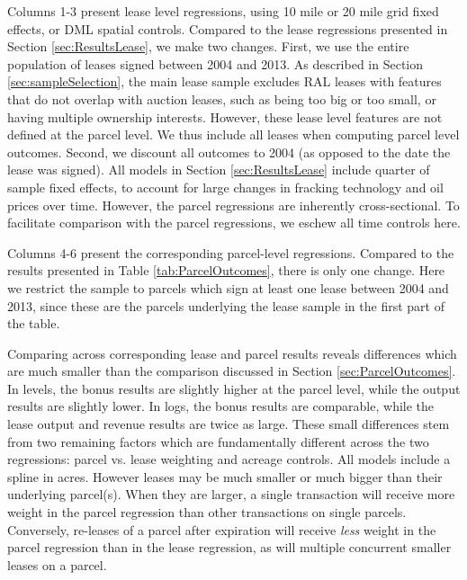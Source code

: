 \begin{appendices}
Columns 1-3 present lease level regressions, using 10 mile or 20 mile grid fixed effects, or DML spatial controls. Compared to the lease regressions presented in Section \ref{sec:ResultsLease}, we make two changes. First, we use the entire population of leases signed between 2004 and 2013. As described in Section \ref{sec:sampleSelection}, the main lease sample excludes RAL leases with features that do not overlap with auction leases, such as being too big or too small, or having multiple ownership interests. However, these lease level features are not defined at the parcel level. We thus include all leases when computing parcel level outcomes. Second, we discount all outcomes to 2004 (as opposed to the date the lease was signed). All models in Section \ref{sec:ResultsLease} include quarter of sample fixed effects, to account for large changes in fracking technology and oil prices over time. However, the parcel regressions are inherently cross-sectional. To facilitate comparison with the parcel regressions, we eschew all time controls here. 

Columns 4-6 present the corresponding parcel-level regressions. Compared to the results presented in Table \ref{tab:ParcelOutcomes}, there is only one change. Here we restrict the sample to parcels which sign at least one lease between 2004 and 2013, since these are the parcels underlying the lease sample in the first part of the table. 

Comparing across corresponding lease and parcel results reveals differences which are much smaller than the comparison discussed in Section \ref{sec:ParcelOutcomes}. In levels, the bonus results are slightly higher at the parcel level, while the output results are slightly lower. In logs, the bonus results are comparable, while the lease output and revenue results are twice as large. These small differences stem from two remaining factors which are fundamentally different across the two regressions: parcel vs. lease weighting and acreage controls. All models include a spline in acres. However leases may be much smaller or much bigger than their underlying parcel(s). When they are larger, a single transaction will receive more weight in the parcel regression than other transactions on single parcels. Conversely, re-leases of a parcel after expiration will receive \textit{less} weight in the parcel regression than in the lease regression, as will multiple concurrent smaller leases on a parcel. 

\addtolength{\tabcolsep}{-6pt}


\end{appendices}
